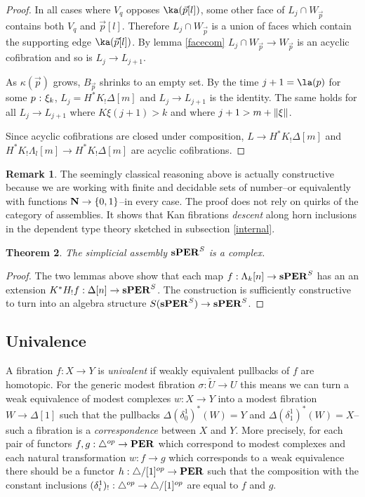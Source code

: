\documentclass{amsart}
\theoremstyle{plain}
\newtheorem{theorem}{Theorem}
\theoremstyle{definition}
\newtheorem{remark}[theorem]{Remark}
\newcommand\set[1]{\left\{#1\right\}}
\newcommand\ri{^*}
\begin{document}
\begin{proof}
In all cases where $V_q$ opposes $\ka(\vec p[l])$, some other face of $L_j\cap W_{\vec p}$ contains both $V_q$ and $\vec p[l]$. Therefore $L_j\cap W_{\vec p}$ is a union of faces which contain the supporting edge $\ka(\vec p[l])$. By lemma \ref{facecom} $L_j\cap W_{\vec p}\to W_{\vec p}$ is an acyclic cofibration and so is $L_j\to L_{j+1}$.

As $\kappa(\vec p)$ grows, $B_{\vec p}$ shrinks to an empty set. By the time $j+1 = \la(p)$ for some $p\mathord{\ :\ } \xi_k$, $L_j = H^*K_!\Delta[m]$ and $L_j\to L_{j+1}$ is the identity. The same holds for all $L_j\to L_{j+1}$ where $K\xi(j+1)>k$ and where $j+1>m+\left\Vert\xi\right\Vert$.

Since acyclic cofibrations are closed under composition, $L\to H^*K_!\Delta[m]$ and $H^*K_!\Lambda_l[m] \to H^*K_!\Delta[m]$ are acyclic cofibrations.
\end{proof}%

\begin{remark} The seemingly classical reasoning above is actually constructive because we are working with finite and decidable sets of number--or equivalently with functions $\nno \to \set{0,1}$--in every case. The proof does not rely on quirks of the category of assemblies. It shows that Kan fibrations \emph{descent} along horn inclusions in the dependent type theory sketched in subsection \ref{internal}. \end{remark}

\begin{theorem} The simplicial assembly $\mathbf{s}\mathbf{PER}^S$ is a complex. \label{complex} \end{theorem}

\begin{proof} The two lemmas above show that each map $f:\Lambda_k[n] \to \mathbf{s}\mathbf{PER}^S$ has an an extension $K^*H_!f:\Delta[n] \to \mathbf{s}\mathbf{PER}^S$. The construction is sufficiently constructive to turn into an algebra structure $S(\mathbf{s}\mathbf{PER}^S) \to \mathbf{s}\mathbf{PER}^S$. \end{proof}

\subsection{Univalence}
A fibration $f:X\to Y$ is \emph{univalent} if weakly equivalent pullbacks of $f$ are homotopic. For the generic modest fibration $\sigma:\tilde U \to U$ this means we can turn a weak equivalence of modest complexes $w:X\to Y$ into a modest fibration $W\to \Delta[1]$ such that the pullbacks $\Delta(\delta^1_0)\ri(W) = Y$ and $\Delta(\delta^1_1)\ri(W) = X$--such a fibration is a \emph{correspondence} between $X$ and $Y$. More precisely, for each pair of functors $f,g:{\mathord{\triangle}}^{op}\to\mathbf{PER}$ which correspond to modest complexes and each natural transformation $w:f\to g$ which corresponds to a weak equivalence there should be a functor $h:{\mathord{\triangle}}/[1]^{op} \to \mathbf{PER}$ such that the composition with the constant inclusions $(\delta^1_i)_!:{\mathord{\triangle}}^{op}\to {\mathord{\triangle}}/[1]^{op}$ are equal to $f$ and $g$. 
\end{document}
